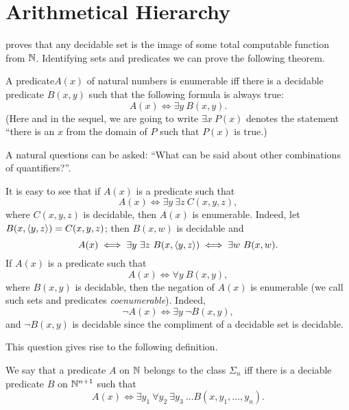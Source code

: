 \chapter{Arithmetical Hierarchy}

 proves that any decidable set
is the image of some total computable function from ${\mathbb{N}}$. Identifying sets and
predicates we can prove the following theorem.
\begin{theorem}
  A predicate$A(x)$ of natural numbers is enumerable iff there is a decidable
  predicate $B(x, y)$ such that the following formula is always true:
  \[
    A(x) \iff \exists y \  B(x, y).
  \]
  (Here and in the sequel, we are going to write $\exists x \  P(x)$ denotes the
  statement ``there is an $x$ from the domain of $P$ such that $P(x)$ is true.)
\end{theorem}

A natural questions can be asked: ``What can be said about other combinations of
quantifiers?''.

It is easy to see that if $A(x)$ is a predicate such that 
\[
  A(x) \iff \exists y \  \exists z \  C(x, y, z),
\]
where $C(x, y, z)$ is decidable, then $A(x)$ is enumerable.
Indeed, let $B(x, \langle {y}, {z} \rangle) = C(x, y, z)$; then $B(x, w)$ is decidable and 
\[
  A(x) \iff \exists y \  \exists z \  B(x, \langle {y}, {z} \rangle) \iff 
    \exists w \  B(x, w).
\]
If $A(x)$ is a predicate such that 
\[
  A(x) \iff \forall y \  B(x, y),
\]
where $B(x, y)$ is decidable, then the negation of $A(x)$ is enumerable (we call
such sets and predicates \emph{coenumerable}). Indeed, 
\[
  \lnot A(x) \iff \exists y \  \lnot B(x, y),
\]
and $\lnot B(x, y)$ is decidable since the compliment of a decidable set is
decidable.

This question gives rise to the following definition.
\begin{definition}
  We say that a predicate $A$ on ${\mathbb{N}}$ belongs to the class $\Sigma_n$ iff there
  is a deciable predicate $B$ on ${\mathbb{N}}^{n + 1}$ such that 
  \[
    A(x) \iff 
    \exists y_1 \  \forall y_2 \  \exists y_3 \  \dots B(x, y_1, \dots, y_n).
  \]
\end{definition}
